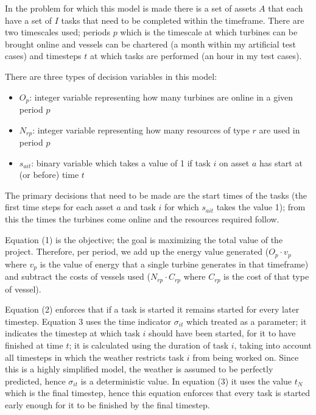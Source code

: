 \documentclass[a4paper,12pt]{article}
\begin{document}
In the problem for which this model is made there is a set of assets $A$ that each have a set of $I$ tasks that need to be completed within the timeframe. There are two timescales used; periods $p$ which is the timescale at which turbines can be brought online and vessels can be chartered (a month within my artificial test cases) and timesteps $t$ at which tasks are performed (an hour in my test cases). 

There are three types of decision variables in this model: 

\begin{itemize}
\item $O_p$: integer variable representing how many turbines are online in a given period $p$
\item $N_{rp}$: integer variable representing how many resources of type $r$ are used in period $p$
\item $s_{ait}$: binary variable which takes a value of 1 if task $i$ on asset $a$ has start at (or before) time $t$
\end{itemize}

The primary decisions that need to be made are the start times of the tasks (the first time steps for each asset $a$ and task $i$ for which $s_{ait}$ takes the value 1); from this the times the turbines come online and the resources required follow. 

Equation (1) is the objective; the goal is maximizing the total value of the project. Therefore, per period, we add up the energy value generated ($O_p \cdot v_p$ where $v_p$ is the value of energy that a single turbine generates in that timeframe) and subtract the costs of vessels used ($N_{rp} \cdot C_{rp}$ where $C_{rp}$ is the cost of that type of vessel). 

Equation (2) enforces that if a task is started it remains started for every later timestep. Equation 3 uses the time indicator $\sigma_{it}$ which treated as a parameter; it indicates the timestep at which task $i$ should have been started, for it to have finished at time $t$; it is calculated using the duration of task $i$, taking into account all timesteps in which the weather restricts task $i$ from being worked on. Since this is a highly simplified model, the weather is assumed to be perfectly predicted, hence $\sigma_{it}$ is a deterministic value. In equation (3) it uses the value $t_N$ which is the final timestep, hence this equation enforces that every task is started early enough for it to be finished by the final timestep. 
\end{document}
